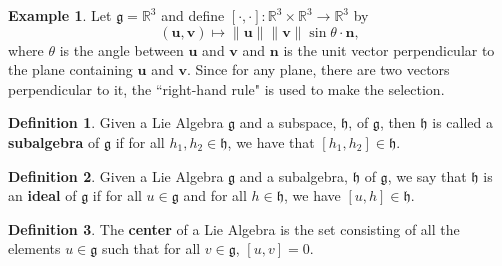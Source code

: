 \documentclass[12pt]{article}
\theoremstyle{definition}
\newtheorem{definition}{Definition}[section]
\theoremstyle{definition}
\newtheorem{exmp}{Example}[section]
\newcommand{\norm}[1]{\| #1 \|}
\begin{document}
        \begin{exmp}
            Let $\mathfrak{g}=\mathbb{R}^3$ and define $[\cdot,
            \cdot]:\mathbb{R}^3\times\mathbb{R}^3\to\mathbb{R}^3$ by
                \begin{equation*}
                    (\mathbf{u},
                    \mathbf{v})\mapsto\norm{\mathbf{u}}\norm{\mathbf{v}}\sin\theta\cdot\mathbf{n},
                \end{equation*}
            where $\theta$ is the angle between $\mathbf{u}$ and $\mathbf{v}$
            and $\mathbf{n}$ is the unit vector perpendicular to the plane
            containing $\mathbf{u}$ and $\mathbf{v}$. Since for any plane,
            there are two vectors perpendicular to it, the ``right-hand rule"
            is used to make the selection. 
        \end{exmp}
        \begin{definition}
            Given a Lie Algebra $\mathfrak{g}$ and a subspace, $\mathfrak{h}$,
            of $\mathfrak{g}$, then $\mathfrak{h}$ is called
            a \textbf{subalgebra} of $\mathfrak{g}$ if for all $h_1,
            h_2\in\mathfrak{h}$, we have that $[h_1, h_2]\in\mathfrak{h}$.
        \end{definition}
        \begin{definition}
            Given a Lie Algebra $\mathfrak{g}$ and a subalgebra, $\mathfrak{h}$
            of $\mathfrak{g}$, we say that $\mathfrak{h}$ is an \textbf{ideal}
            of $\mathfrak{g}$ if for all $u\in\mathfrak{g}$ and for all
            $h\in\mathfrak{h}$, we have $[u, h]\in\mathfrak{h}$.
        \end{definition}
        \begin{definition}
            The \textbf{center} of a Lie Algebra is the set consisting of all
            the elements $u\in \mathfrak{g}$ such that for all $v\in
            \mathfrak{g}$, $[u, v]=0$.
        \end{definition}
\end{document}
